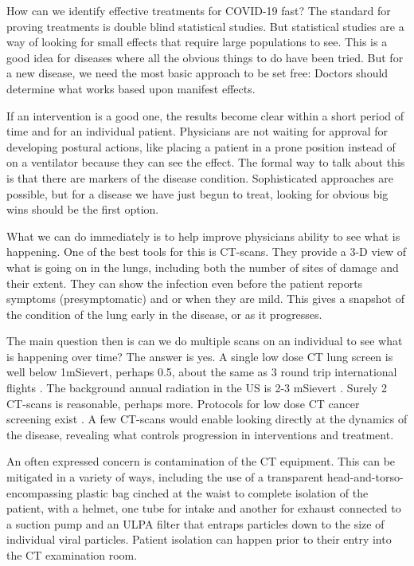 \documentclass[onecolumn,journal]{IEEEtran}
\begin{document}
\begin{multicols}{2}

How can we identify effective treatments for COVID-19 fast? The standard for proving treatments is double blind statistical studies. But statistical studies are a way of looking for small effects that require large populations to see. This is a good idea for diseases where all the obvious things to do have been tried. But for a new disease, we need the most basic approach to be set free: Doctors should determine what works based upon manifest effects. 

If an intervention is a good one, the results become clear within a short period of time and for an individual patient. Physicians are not waiting for approval for developing postural actions, like placing a patient in a prone position instead of on a ventilator because they can see the effect. The formal way to talk about this is that there are markers of the disease condition. Sophisticated approaches are possible, but for a disease we have just begun to treat, looking for obvious big wins should be the first option. 

What we can do immediately is to help improve physicians ability to see what is happening. One of the best tools for this is CT-scans. They provide a 3-D view of what is going on in the lungs, including both the number of sites of damage and their extent. They can show the infection even before the patient reports symptoms (presymptomatic) and or when they are mild. This gives a snapshot of the condition of the lung early in the disease, or as it progresses.

The main question then is can we do multiple scans on an individual to see what is happening over time? The answer is yes. A  single low dose CT lung screen is well below 1mSievert, perhaps 0.5, about the same as 3 round trip international flights \cite{r1}. The background annual radiation in the US is 2-3 mSievert \cite{r2}. Surely 2 CT-scans is reasonable, perhaps more. Protocols for low dose CT cancer screening exist \cite{cancer}. A few CT-scans would enable looking directly at the dynamics of the disease, revealing what controls progression in interventions and treatment.

An often expressed concern is contamination of the CT equipment. This can be mitigated in a variety of ways, including the use of a transparent head-and-torso-encompassing plastic bag cinched at the waist to complete isolation of the patient, with a helmet, one tube for intake and another for exhaust connected to a suction pump and an ULPA filter that entraps particles down to the size of individual viral particles. Patient isolation can happen prior to their entry into the CT examination room. 


\end{multicols}
\end{document}
